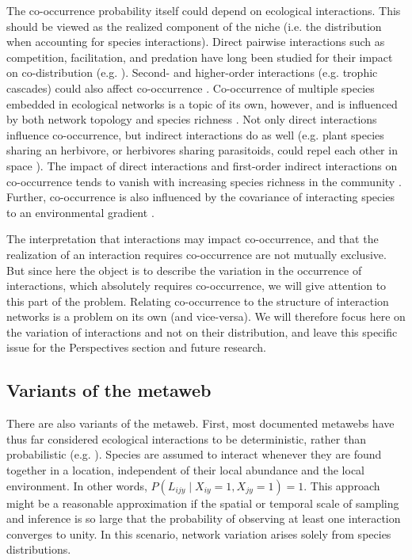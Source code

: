 \documentclass[12pt]{article}
\begin{document}
The co-occurrence probability itself could depend on ecological interactions.
This should be viewed as the realized component of the niche (i.e. the
distribution when accounting for species interactions). Direct pairwise
interactions such as competition, facilitation, and predation have long been
studied for their impact on co-distribution (e.g. \citealt{Diamond1975,
Connor1979, Gotelli2000}). Second- and higher-order interactions (e.g. trophic
cascades) could also affect co-occurrence \citep{Harris2016,
Staniczenko2017}. Co-occurrence of multiple species embedded in ecological
networks is a topic of its own, however, and is influenced by both network
topology and species richness \citep{Cazelles2016}. Not only direct
interactions influence co-occurrence, but indirect interactions do as well
(e.g. plant species sharing an herbivore, or herbivores sharing parasitoids,
could repel each other in space \citep{Holt1993}). The impact of direct
interactions and first-order indirect interactions on co-occurrence tends to
vanish with increasing species richness in the community \citep{Cazelles2016}.
Further, co-occurrence is also influenced by the covariance of interacting
species to an environmental gradient \citep{Cazelles2015}.

The interpretation that interactions may impact co-occurrence, and that the
realization of an interaction requires co-occurrence are not mutually
exclusive. But since here the object is to describe the variation in the
occurrence of interactions, which absolutely requires co-occurrence, we will
give attention to this part of the problem. Relating co-occurrence to the
structure of interaction networks is a problem on its own (and vice-versa). We
will therefore focus here on the variation of interactions and not on their
distribution, and leave this specific issue for the Perspectives section and
future research.

\subsection*{Variants of the metaweb}

There are also variants of the metaweb. First, most documented metawebs have
thus far considered ecological interactions to be deterministic, rather than
probabilistic (e.g. \citealt{Havens1992, Wood2015}). Species are assumed to
interact whenever they are found together in a location, independent of their
local abundance and the local environment. In other words,
$P(L_{ijy}\mid X_{iy}=1,X_{jy}=1) = 1$. This approach might be a reasonable
approximation if the spatial or temporal scale of sampling and inference is so
large that the probability of observing at least one interaction converges to
unity. In this scenario, network variation arises solely from species
distributions.
\end{document}
